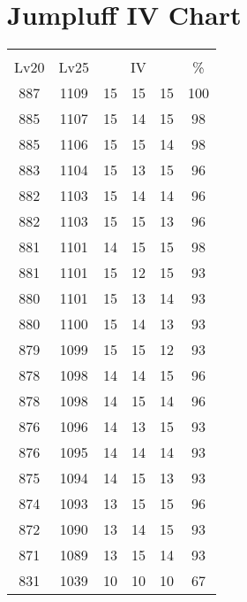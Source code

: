 \documentclass{article}%
\begin{document}
%
\normalsize%
\section{Jumpluff IV Chart}%
\label{sec:Jumpluff IV Chart}%
\renewcommand{\arraystretch}{1.5}%
\begin{tabular}{|c|c|c|c|c|c|}%
\hline%
\multicolumn{6}{|c|}{\textcolor{white}{ 
\linebreak{Jumpluff}
}%
\cellcolor{black}}\\%
\multicolumn{1}{|c}{Lv20}&\multicolumn{1}{c|}{Lv25}&\multicolumn{3}{c|}{IV}&\multicolumn{1}{|c|}{\%}\\%
\hline%
\rowcolor{color100}%
887&1109&15&15&15&100\\%
\hline%
\rowcolor{color98}%
885&1107&15&14&15&98\\%
\hline%
\rowcolor{color98}%
885&1106&15&15&14&98\\%
\hline%
\rowcolor{color96}%
883&1104&15&13&15&96\\%
\hline%
\rowcolor{color96}%
882&1103&15&14&14&96\\%
\hline%
\rowcolor{color96}%
882&1103&15&15&13&96\\%
\hline%
\rowcolor{color98}%
881&1101&14&15&15&98\\%
\hline%
\rowcolor{color93}%
881&1101&15&12&15&93\\%
\hline%
\rowcolor{color93}%
880&1101&15&13&14&93\\%
\hline%
\rowcolor{color93}%
880&1100&15&14&13&93\\%
\hline%
\rowcolor{color93}%
879&1099&15&15&12&93\\%
\hline%
\rowcolor{color96}%
878&1098&14&14&15&96\\%
\hline%
\rowcolor{color96}%
878&1098&14&15&14&96\\%
\hline%
\rowcolor{color93}%
876&1096&14&13&15&93\\%
\hline%
\rowcolor{color93}%
876&1095&14&14&14&93\\%
\hline%
\rowcolor{color93}%
875&1094&14&15&13&93\\%
\hline%
\rowcolor{color96}%
874&1093&13&15&15&96\\%
\hline%
\rowcolor{color93}%
872&1090&13&14&15&93\\%
\hline%
\rowcolor{color93}%
871&1089&13&15&14&93\\%
\hline%
\rowcolor{color91}%
831&1039&10&10&10&67\\%
\end{tabular}

%
\end{document}
